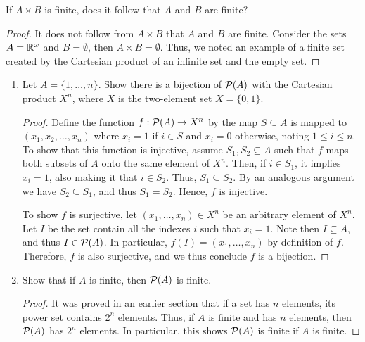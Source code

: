 \documentclass[12pt]{article}
\begin{document}
     If $A \times B$ is finite, does it follow that $A$ and $B$
    are finite?

    \begin{proof}
        It does not follow from $A \times B$ that $A$ and $B$ are finite.
        Consider the sets $A = \mathbb{R}^\omega$ and $B = \emptyset$, then
        $A \times B = \emptyset$. Thus, we noted an example of a 
        finite set created by the Cartesian product of an infinite set
        and the empty set. 
    \end{proof}

    \begin{enumerate}[label=(\alph*)]
        \item Let $A = \{1, \ldots, n\}$. Show there is a bijection of 
        $\mathcal{P}(A)$ with the Cartesian product $X^n$, where $X$ is the 
        two-element set $X = \{0, 1\}$.
        \begin{proof}
            Define the function $f: \mathcal{P}(A) \to X^n$ by 
            the map $S \subseteq A$ is mapped to $(x_1, x_2, \ldots, x_n)$
            where $x_i = 1$ if $i \in S$ and $x_i = 0$ otherwise,
            noting $1 \leq i \leq n$. To show that this function is 
            injective, assume $S_1, S_2 \subseteq A$ such that
            $f$ maps both subsets of $A$ onto the same element of 
            $X^n$. Then, if $i \in S_1$, it implies $x_i = 1$,
            also making it that $i \in S_2$. Thus, $S_1 \subseteq S_2$.
            By an analogous argument we have $S_2 \subseteq S_1$, and 
            thus $S_1 = S_2$. Hence, $f$ is injective.
            
            To show $f$ is surjective, let $(x_1, \ldots, x_n) \in X^n$
            be an arbitrary element of $X^n$. Let $I$ be the set contain all the indexes
            $i$ such that $x_i = 1$. Note then $I \subseteq A$, and thus
            $I \in \mathcal{P}(A)$. In particular, $f(I) = (x_1, \ldots, x_n)$
            by definition of $f$. Therefore, $f$ is also surjective, and we 
            thus conclude $f$ is a bijection. 
        \end{proof}
        \item Show that if $A$ is finite, then $\mathcal{P}(A)$ is finite.
        \begin{proof}
            It was proved in an earlier section that if a set has $n$ 
            elements, its power set contains $2^n$ elements. 
            Thus, if $A$ is finite and has $n$ elements, then
            $\mathcal{P}(A)$ has $2^n$ elements. In particular, this
            shows $\mathcal{P}(A)$ is finite if $A$ is finite.
        \end{proof}
    \end{enumerate}
\end{document}
